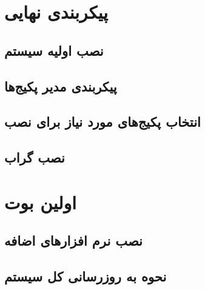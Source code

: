 \section{پیکربندی نهایی}
\subsection{نصب اولیه سیستم}
\begin{frame}

\end{frame}

\subsection{پیکربندی مدیر پکیج‌ها}
\begin{frame}

\end{frame}

\subsection{انتخاب پکیج‌های مورد نیاز برای نصب}
\begin{frame}

\end{frame}

\subsection{نصب گراب}
\begin{frame}

\end{frame}

\section{اولین بوت}
\begin{frame}

\end{frame}

\subsection{نصب نرم افزارهای اضافه}
\begin{frame}

\end{frame}

\subsection{نحوه به روزرسانی کل سیستم}
\begin{frame}

\end{frame}


